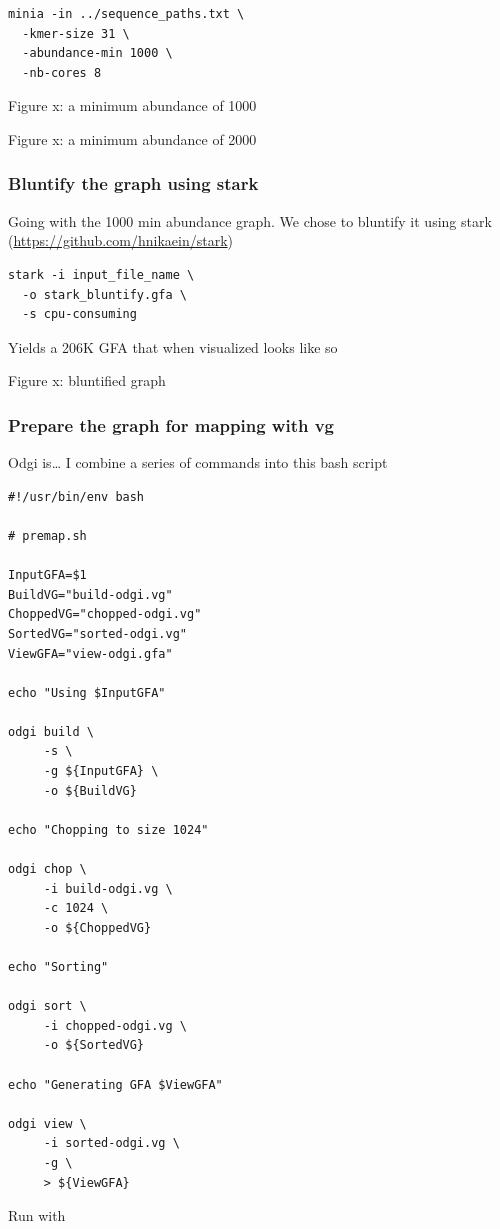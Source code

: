 \documentclass[10pt, a4paper]{article}
\begin{document}
\begin{verbatim}
minia -in ../sequence_paths.txt \
  -kmer-size 31 \
  -abundance-min 1000 \
  -nb-cores 8
\end{verbatim}

Figure x: a minimum abundance of 1000

Figure x: a minimum abundance of 2000
\subsubsection{Bluntify the graph using stark}
\label{sec:org233bc12}
Going with the 1000 min abundance graph. We chose to bluntify it using stark
(\url{https://github.com/hnikaein/stark}) 

\begin{verbatim}
stark -i input_file_name \
  -o stark_bluntify.gfa \
  -s cpu-consuming
\end{verbatim}

Yields a  206K GFA that when visualized looks like so

Figure x: bluntified graph 


\subsubsection{Prepare the graph for mapping with vg}
\label{sec:org3cba72c}
Odgi is\ldots{}
I combine a series of commands into this bash script

\begin{verbatim}
#!/usr/bin/env bash

# premap.sh

InputGFA=$1
BuildVG="build-odgi.vg"
ChoppedVG="chopped-odgi.vg"
SortedVG="sorted-odgi.vg"
ViewGFA="view-odgi.gfa"

echo "Using $InputGFA"

odgi build \
     -s \
     -g ${InputGFA} \
     -o ${BuildVG}

echo "Chopping to size 1024"

odgi chop \
     -i build-odgi.vg \
     -c 1024 \
     -o ${ChoppedVG}

echo "Sorting"

odgi sort \
     -i chopped-odgi.vg \
     -o ${SortedVG}

echo "Generating GFA $ViewGFA"

odgi view \
     -i sorted-odgi.vg \
     -g \
     > ${ViewGFA}
\end{verbatim}

Run with
\end{document}
